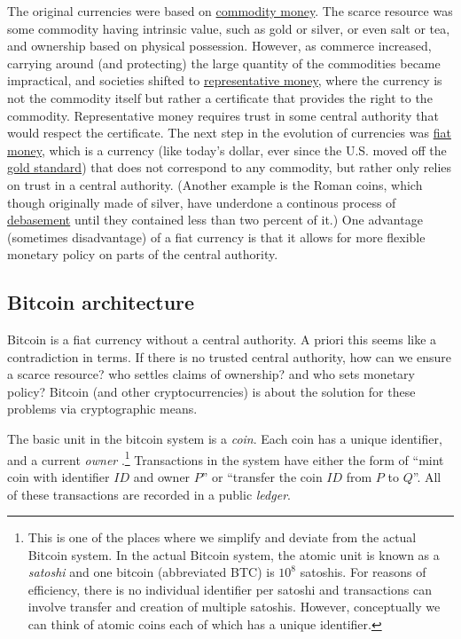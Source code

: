 The original currencies were based on
\href{https://goo.gl/K7awAW}{commodity money}. The scarce resource was
some commodity having intrinsic value, such as gold or silver, or even
salt or tea, and ownership based on physical possession. However, as
commerce increased, carrying around (and protecting) the large quantity
of the commodities became impractical, and societies shifted to
\href{https://goo.gl/K6c4qP}{representative money}, where the currency
is not the commodity itself but rather a certificate that provides the
right to the commodity. Representative money requires trust in some
central authority that would respect the certificate. The next step in
the evolution of currencies was
\href{https://en.wikipedia.org/wiki/Fiat_money}{fiat money}, which is a
currency (like today's dollar, ever since the U.S. moved off the
\href{https://goo.gl/SPN5BS}{gold standard}) that does not correspond to
any commodity, but rather only relies on trust in a central authority.
(Another example is the Roman coins, which though originally made of
silver, have underdone a continous process of
\href{https://goo.gl/ZDkGzL}{debasement} until they contained less than
two percent of it.) One advantage (sometimes disadvantage) of a fiat
currency is that it allows for more flexible monetary policy on parts of
the central authority.

\subsection{Bitcoin architecture}\label{Bitcoin-architecture}

Bitcoin is a fiat currency without a central authority. A priori this
seems like a contradiction in terms. If there is no trusted central
authority, how can we ensure a scarce resource? who settles claims of
ownership? and who sets monetary policy? Bitcoin (and other
cryptocurrencies) is about the solution for these problems via
cryptographic means.

The basic unit in the bitcoin system is a \emph{coin}. Each coin has a
unique identifier, and a current \emph{owner} .\footnote{This is one of
  the places where we simplify and deviate from the actual Bitcoin
  system. In the actual Bitcoin system, the atomic unit is known as a
  \emph{satoshi} and one bitcoin (abbreviated BTC) is \(10^8\) satoshis.
  For reasons of efficiency, there is no individual identifier per
  satoshi and transactions can involve transfer and creation of multiple
  satoshis. However, conceptually we can think of atomic coins each of
  which has a unique identifier.} Transactions in the system have either
the form of ``mint coin with identifier \(\ensuremath{\mathit{ID}}\) and
owner \(P\)'' or ``transfer the coin \(\ensuremath{\mathit{ID}}\) from
\(P\) to \(Q\)''. All of these transactions are recorded in a public
\emph{ledger}.

